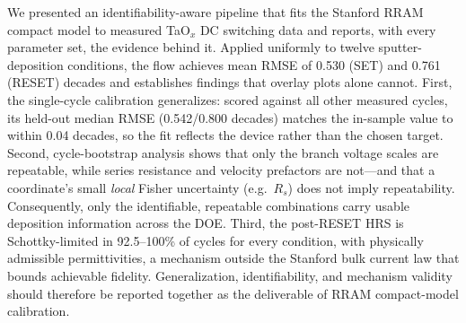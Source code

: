 \documentclass[journal]{IEEEtran}
\begin{document}
We presented an identifiability-aware pipeline that fits the Stanford RRAM
compact model to measured TaO$_x$ DC switching data and reports, with every
parameter set, the evidence behind it.  Applied uniformly to twelve
sputter-deposition conditions, the flow achieves mean RMSE of 0.530 (SET) and
0.761 (RESET) decades and establishes findings that overlay plots alone
cannot.  First, the single-cycle calibration generalizes: scored against all
other measured cycles, its held-out median RMSE (0.542/0.800 decades) matches
the in-sample value to within 0.04 decades, so the fit reflects the device
rather than the chosen target.  Second, cycle-bootstrap analysis shows that
only the branch voltage scales are repeatable, while series resistance and
velocity prefactors are not---and that a coordinate's small \emph{local}
Fisher uncertainty (e.g.\ $R_s$) does not imply repeatability.  Consequently,
only the identifiable, repeatable combinations carry usable deposition
information across the DOE.  Third, the post-RESET HRS is Schottky-limited in
92.5--100\% of cycles for every condition, with physically admissible
permittivities, a mechanism outside the Stanford bulk current law that bounds
achievable fidelity.  Generalization, identifiability, and mechanism validity
should therefore be reported together as the deliverable of RRAM
compact-model calibration.
\end{document}
